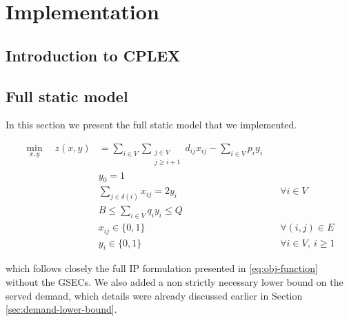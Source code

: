 \chapter{Implementation}


\section{Introduction to CPLEX}



\section{Full static model}

In this section we present the full static model that we implemented.

\begin{align}
	\min_{x,y} \quad z(x, y) & =  \sum_{i \in V} \sum_{\substack{j \in V                                                                                                   \\ j \ge i + 1}} d_{ij} x_{ij} - \sum_{i \in V} p_i y_i \label{eq:obj-function}\\
	                         & y_0 = 1                                           & \label{eq:full-static-model-depot-part-of-tour-constraint}                              \\
	                         & \sum_{j \in \delta(i)}       x_{ij}    = 2 y_i    & \quad \forall i \in V         \label{eq:full-static-model-flow-conservation-constraint} \\
	                         & B \le   \sum_{i \in V} q_i y_i   \le Q            & \label{eq:full-static-model-resource-upper-bound-constraint}                            \\
	                         & x_{ij}                   \in \lbrace 0, 1 \rbrace & \quad \forall (i, j) \in E               \label{eq:full-static-model-x-mip-var-bounds}  \\
	                         & y_{i}                    \in \lbrace 0, 1 \rbrace & \quad \forall i \in V,\ i \ge 1          \label{eq:full-static-model-y-mip-var-bounds}
\end{align}

which follows closely the full IP formulation presented in \eqref{eq:obj-function} without the GSECs.
We also added a non strictly necessary lower bound on the served demand, which details were already discussed earlier in Section \ref{sec:demand-lower-bound}.

